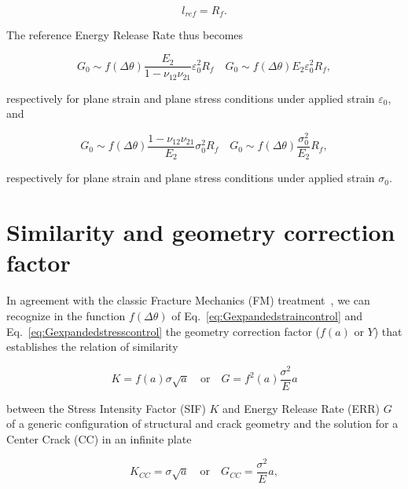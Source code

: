 \documentclass[a4paper,fleqn]{cas-dc}
\begin{document}
\begin{equation}\label{eq:lref}
l_{ref}=R_{f}.
\end{equation}

The reference Energy Release Rate thus becomes

\begin{equation}\label{eq:Gexpandedstraincontrol}
G_{0}\sim f\left(\Delta\theta\right)\frac{E_{2}}{1-\nu_{12}\nu_{21}}\varepsilon_{0}^{2}R_{f}\quad G_{0}\sim f\left(\Delta\theta\right)E_{2}\varepsilon_{0}^{2}R_{f},
\end{equation}

respectively for plane strain and plane stress conditions under applied strain $\varepsilon_{0}$, and

\begin{equation}\label{eq:Gexpandedstresscontrol}
G_{0}\sim f\left(\Delta\theta\right)\frac{1-\nu_{12}\nu_{21}}{E_{2}}\sigma_{0}^{2}R_{f}\quad G_{0}\sim f\left(\Delta\theta\right)\frac{\sigma_{0}^{2}}{E_{2}}R_{f},
\end{equation}

respectively for plane strain and plane stress conditions under applied strain $\sigma_{0}$.

\section{Similarity and geometry correction factor}

In agreement with the classic Fracture Mechanics (FM) treatment~\cite{Tada2000}, we can recognize in the function $f\left(\Delta\theta\right)$ of Eq.~\ref{eq:Gexpandedstraincontrol} and Eq.~\ref{eq:Gexpandedstresscontrol} the geometry correction factor ($f\left(a\right)$ or $Y$) that establishes the relation of similarity~\cite{Barenblatt2006}

\begin{equation}\label{eq:Gsim}
K=f\left(a\right)\sigma\sqrt{a}\quad\text{or}\quad G=f^{2}\left(a\right)\frac{\sigma^{2}}{E}a
\end{equation}

between the Stress Intensity Factor (SIF) $K$ and Energy Release Rate (ERR) $G$ of a generic configuration of structural and crack geometry and the solution for a Center Crack (CC) in an infinite plate

\begin{equation}\label{eq:Gsim}
K_{CC}=\sigma\sqrt{a}\quad\text{or}\quad G_{CC}=\frac{\sigma^{2}}{E}a,
\end{equation}
\end{document}
